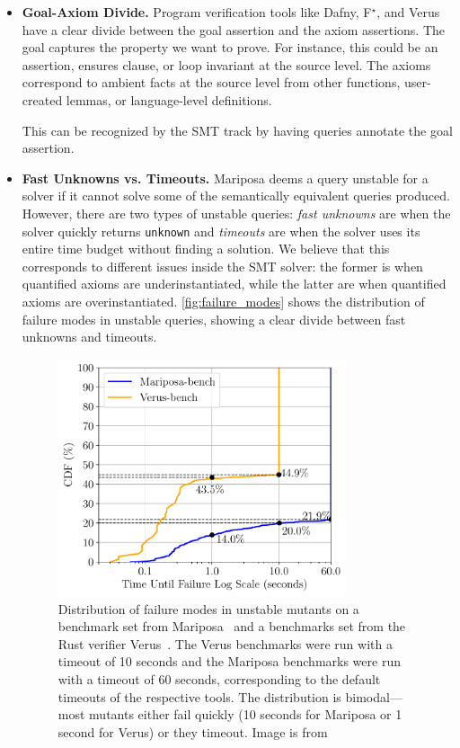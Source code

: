 \documentclass[
]{ceurart}
\newcommand{\fstar}{F${}^\star$\xspace}
\begin{document}
\begin{itemize}
\item \textbf{Goal-Axiom Divide.} Program verification tools like Dafny, \fstar,
and Verus have a clear divide between the goal assertion and the axiom
assertions. The goal captures the property we want to prove. For instance, this
could be an assertion, ensures clause, or loop invariant at the source level.
The axioms correspond to ambient facts at the source level from other functions,
user-created lemmas, or language-level definitions. 

This can be recognized by the SMT track by having queries annotate the goal
assertion.

\item \textbf{Fast Unknowns vs. Timeouts.} Mariposa deems a query unstable for a
solver if it cannot solve some of the semantically equivalent queries
produced. However, there are two types of unstable queries: \emph{fast unknowns}
are when the solver quickly returns \texttt{unknown} and \emph{timeouts} are
when the solver uses its entire time budget without finding a solution. We
believe that this corresponds to different issues inside the SMT solver: the
former is when quantified axioms are underinstantiated, while the latter are
when quantified axioms are overinstantiated. \autoref{fig:failure_modes} shows
the distribution of failure modes in unstable queries, showing a clear divide
between fast unknowns and timeouts.

\begin{figure}[t]
    \centering
    \includegraphics[width=0.8\textwidth]{fig/debugger/failure_modes.pdf}
    \caption{Distribution of failure modes in unstable mutants on a benchmark set from Mariposa~\cite{mariposa} and a benchmarks set from the Rust verifier Verus~\cite{verus-ghost}. The Verus benchmarks were run with a timeout of 10 seconds and the Mariposa benchmarks were run with a timeout of 60 seconds, corresponding to the default timeouts of the respective tools. The distribution is bimodal—most mutants either fail quickly (10 seconds for Mariposa or 1 second for Verus) or they timeout. Image is from \citet{cazamariposas}}
    \label{fig:failure_modes}
\end{figure}


\end{itemize}
\end{document}
